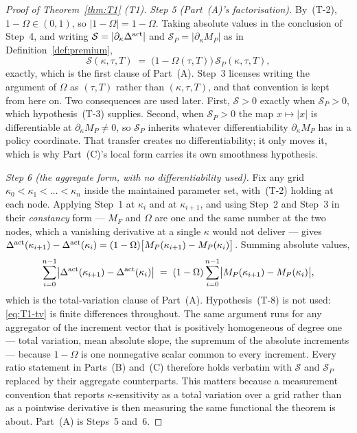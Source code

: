 \begin{proof}[Proof of Theorem~\ref{thm:T1} (T1)]
\emph{Step 5 (Part~(A)'s factorisation).} By~(T-2), $1-\Omega \in (0,1)$, so
$|1-\Omega| = 1-\Omega$. Taking absolute values in the conclusion of Step~4, and writing
$\mathcal S = |\partial_\kappa\Delta^{\mathrm{act}}|$ and $\mathcal S_P = |\partial_\kappa M_P|$ as in
Definition~\ref{def:premium},
\begin{equation}
\label{eq:T1-factor}
\mathcal S(\kappa,\tau,T) \;=\; \bigl(1-\Omega(\tau,T)\bigr)\,\mathcal S_P(\kappa,\tau,T),
\end{equation}
exactly, which is the first clause of Part~(A). Step~3 licenses writing the argument of $\Omega$ as
$(\tau,T)$ rather than $(\kappa,\tau,T)$, and that convention is kept from here on. Two consequences
are used later. First, $\mathcal S > 0$ exactly when $\mathcal S_P > 0$, which hypothesis~(T-3)
supplies. Second, when $\mathcal S_P > 0$ the map $x \mapsto |x|$ is differentiable at
$\partial_\kappa M_P \neq 0$, so $\mathcal S_P$ inherits whatever differentiability
$\partial_\kappa M_P$ has in a policy coordinate. That transfer creates no differentiability; it
only moves it, which is why Part~(C)'s local form carries its own smoothness hypothesis.

\emph{Step 6 (the aggregate form, with no differentiability used).} Fix any grid
$\kappa_0 < \kappa_1 < \dots < \kappa_n$ inside the maintained parameter set, with~(T-2) holding at
each node. Applying Step~1 at $\kappa_i$ and at $\kappa_{i+1}$, and using Step~2 and Step~3 in their
\emph{constancy} form --- $M_F$ and $\Omega$ are one and the same number at the two nodes, which a
vanishing derivative at a single $\kappa$ would not deliver --- gives
$\Delta^{\mathrm{act}}(\kappa_{i+1}) - \Delta^{\mathrm{act}}(\kappa_i) = (1-\Omega)\bigl[M_P(\kappa_{i+1}) - M_P(\kappa_i)\bigr]$.
Summing absolute values,
\begin{equation}
\label{eq:T1-tv}
\sum_{i=0}^{n-1}\bigl\lvert \Delta^{\mathrm{act}}(\kappa_{i+1}) - \Delta^{\mathrm{act}}(\kappa_i)\bigr\rvert
\;=\; (1-\Omega)\sum_{i=0}^{n-1}\bigl\lvert M_P(\kappa_{i+1}) - M_P(\kappa_i)\bigr\rvert,
\end{equation}
which is the total-variation clause of Part~(A). Hypothesis~(T-8) is not used: \eqref{eq:T1-tv} is
finite differences throughout. The same argument runs for any aggregator of the increment vector
that is positively homogeneous of degree one --- total variation, mean absolute slope, the supremum
of the absolute increments --- because $1-\Omega$ is one nonnegative scalar common to every
increment. Every ratio statement in Parts~(B) and~(C) therefore holds verbatim with $\mathcal S$ and
$\mathcal S_P$ replaced by their aggregate counterparts. This matters because a measurement
convention that reports $\kappa$-sensitivity as a total variation over a grid rather than as a
pointwise derivative is then measuring the same functional the theorem is about. Part~(A) is
Steps~5 and~6.


\end{proof}
